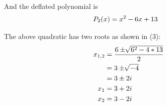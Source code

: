 \begin{exercise}{3}
And the deflated polynomial is
\begin{align}
P_2(x) &= x^2 - 6x + 13 \notag 
\end{align}



The above quadratic has two roots as shown in (3): 
\begin{align}
x_{1,2} &= \frac{6 \pm \sqrt[]{6^2-4*13}}{2} \notag \\
&=3 \pm \sqrt[]{-4} \notag \\
&= 3 \pm 2i \notag \\
x_1 &= 3 + 2i \notag \\
x_2 &= 3 - 2i \notag
\end{align}
\end{exercise}
 
